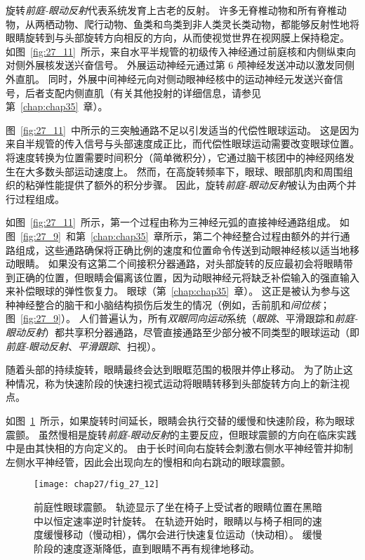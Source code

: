 旋转\textit{前庭-眼动反射}代表系统发育上古老的反射。
许多无脊椎动物和所有脊椎动物，从两栖动物、爬行动物、鱼类和鸟类到非人类灵长类动物，都能够反射性地将眼睛旋转到与头部旋转方向相反的方向，从而使视觉世界在视网膜上保持稳定。
如图~\ref{fig:27_11}~所示，来自水平半规管的初级传入神经通过前庭核和内侧纵束向对侧外展核发送兴奋信号。
外展运动神经元通过第 6 颅神经发送冲动以激发同侧外直肌。
同时，外展中间神经元向对侧动眼神经核中的运动神经元发送兴奋信号，后者支配内侧直肌（有关其他投射的详细信息，请参见第~\ref{chap:chap35}~章）。


图~\ref{fig:27_11}~中所示的三突触通路不足以引发适当的代偿性眼球运动。
这是因为来自半规管的传入信号与头部速度成正比，而代偿性眼球运动需要改变眼球位置。
将速度转换为位置需要时间积分（简单微积分），它通过脑干核团中的神经网络发生在大多数头部运动速度上。
然而，在高旋转频率下，眼球、眼部肌肉和周围组织的粘弹性能提供了额外的积分步骤。
因此，旋转\textit{前庭-眼动反射}被认为由两个并行过程组成。


如图~\ref{fig:27_11}~所示，第一个过程由称为三神经元弧的直接神经通路组成。
如图~\ref{fig:27_9}~和第~\ref{chap:chap35}~章所示，第二个神经整合过程由额外的并行通路组成，这些通路确保将正确比例的速度和位置命令传送到动眼神经核以适当地移动眼睛。
如果没有这第二个间接积分器通路，对头部旋转的反应最初会将眼睛带到正确的位置，但眼睛会偏离该位置，因为动眼神经元将缺乏补偿输入的强直输入来补偿眼球的弹性恢复力。
眼球（第~\ref{chap:chap35}~章）。
这正是被认为参与这种神经整合的脑干和小脑结构损伤后发生的情况（例如，舌前肌和\textit{间位核}；图~\ref{fig:27_9}）。
人们普遍认为，所有\textit{双眼同向运动}系统（\textit{眼跳}、平滑跟踪和\textit{前庭-眼动反射}）都共享积分器通路，尽管直接通路至少部分被不同类型的眼球运动（即\textit{前庭-眼动反射}、\textit{平滑跟踪}、扫视）。


随着头部的持续旋转，眼睛最终会达到眼眶范围的极限并停止移动。
为了防止这种情况，称为快速阶段的快速扫视式运动将眼睛转移到头部旋转方向上的新注视点。


如图~\ref{fig:27_12}~所示，如果旋转时间延长，眼睛会执行交替的缓慢和快速阶段，称为眼球震颤。
虽然慢相是旋转\textit{前庭-眼动反射}的主要反应，但眼球震颤的方向在临床实践中是由其快相的方向定义的。
由于长时间向右旋转会刺激右侧水平神经管并抑制左侧水平神经管，因此会出现向左的慢相和向右跳动的眼球震颤。


\begin{figure}[htbp]
	\centering
	\texttt{[image: chap27/fig\_27\_12]}
	\caption{前庭性眼球震颤。
		轨迹显示了坐在椅子上受试者的眼睛位置在黑暗中以恒定速率逆时针旋转。
		在轨迹开始时，眼睛以与椅子相同的速度缓慢移动（慢动相），偶尔会进行快速复位运动（快动相）。
		缓慢阶段的速度逐渐降低，直到眼睛不再有规律地移动。}
	\label{fig:27_12}
\end{figure}



